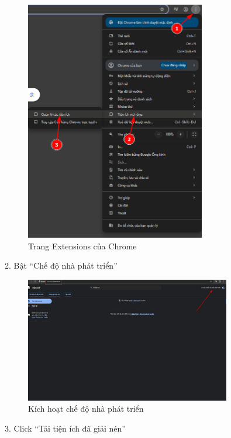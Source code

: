 \documentclass[12pt,a4paper]{article}
\begin{document}
\begin{figure}[H]
  \centering
  \includegraphics[width=0.7\textwidth]{./Images/image1.png}
  \caption{Trang Extensions của Chrome}
\end{figure}

2. Bật ``Chế độ nhà phát triển''

\begin{figure}[H]
  \centering
  \includegraphics[width=0.8\textwidth]{./Images/image2.png}
  \caption{Kích hoạt chế độ nhà phát triển}
\end{figure}

3. Click ``Tải tiện ích đã giải nén''
\end{document}
